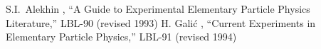 {}
S.I.~Alekhin \etal,
 ``A Guide to Experimental Elementary
 Particle Physics Literature,'' LBL-90 (revised 1993)
\endreference
{}%
H. Gali\'c \etal,
``Current Experiments in
Elementary Particle Physics,''   LBL-91
 (revised 1994)
\endreference
\endreferencelist

